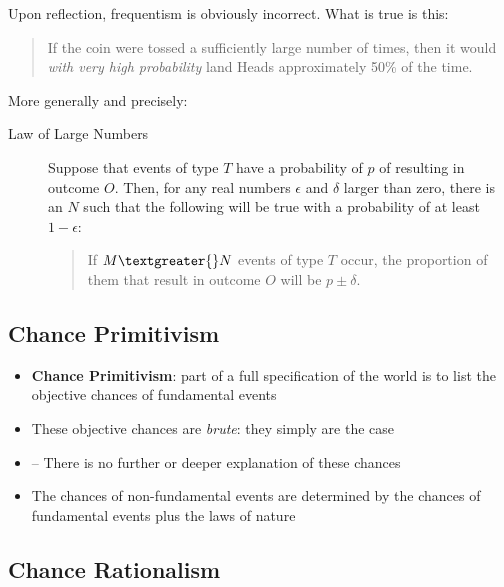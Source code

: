 \documentclass[12pt]{extarticle}
\begin{document}
Upon reflection, frequentism is obviously incorrect. What is true is this:

\begin{quote}
If the coin were tossed a sufficiently large number of times, then it would
\emph{with very high probability} land Heads approximately 50\% of the
time.
\end{quote}
More generally and precisely:
\begin{description}
\item[Law of Large Numbers]
Suppose that events of type $T$ have a probability of $p$ of resulting in outcome $O$. Then, for any real numbers $\epsilon$ and $\delta$ larger than zero, there is an $N$ such that the following will be true with a probability of at least $1-\epsilon$:

\begin{quote}
If $M \textgreater{} N$ events of type
$T$ occur, the proportion of them that
result in outcome $O$ will be $p \pm \delta$.
\end{quote}
\end{description}

\subsection{Chance Primitivism}


\begin{itemize}

\item \textbf{Chance Primitivism}: part of a full specification of the world is to list the objective chances of fundamental events

\item These objective chances are \textit{brute}: they simply are the case

\item[] -- There is no further or deeper explanation of these chances

\item The chances of non-fundamental events are determined by the chances of fundamental events plus the laws of nature

\end{itemize}

\subsection{Chance Rationalism}
\end{document}

